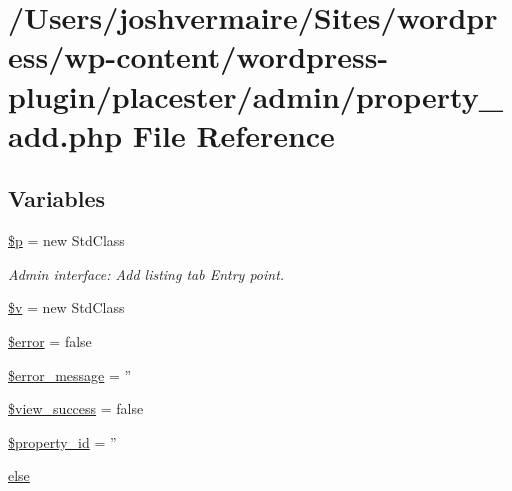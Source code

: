 \hypertarget{property__add_8php}{
\section{/Users/joshvermaire/Sites/wordpress/wp-\/content/wordpress-\/plugin/placester/admin/property\_\-add.php File Reference}
\label{dc/dab/property__add_8php}
}
\subsection*{Variables}
\begin{DoxyCompactItemize}
\item 
\hyperlink{property__add_8php_ab0ed46ece3f8d301125a0f2728d90d7b}{\$p} = new StdClass
\begin{DoxyCompactList}\small\item\em Admin interface: Add listing tab Entry point. \end{DoxyCompactList}\item 
\hyperlink{property__add_8php_abbf14b515de9ac6be1266e3cce64c511}{\$v} = new StdClass
\item 
\hyperlink{property__add_8php_aeba2ab722cedda53dbb7ec1a59f45550}{\$error} = false
\item 
\hyperlink{property__add_8php_ae838cbd355959defbd4d49d0fbe7b273}{\$error\_\-message} = ''
\item 
\hyperlink{property__add_8php_abb388ebff52ac480d577be234950bbf6}{\$view\_\-success} = false
\item 
\hyperlink{property__add_8php_a88c3dc31d5eb48b33b9ed5cfe1ffd62f}{\$property\_\-id} = ''
\item 
\hyperlink{property__add_8php_a0544c3fe466e421738dae463968b70ba}{else}
\end{DoxyCompactItemize}


